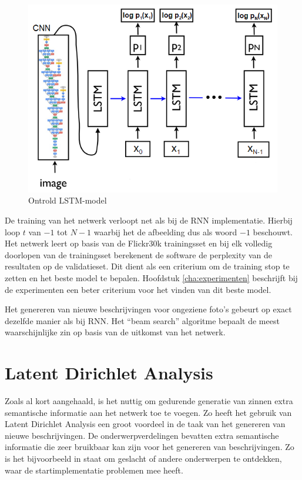 \begin{figure}[tb]
	\centering
	\includegraphics[width=1\linewidth]{Images/vinyals_karpathy.PNG}
	\caption{Ontrold LSTM-model}
	\label{fig:vinyals:karpathy}
\end{figure}

De training van het netwerk verloopt net als bij de RNN implementatie. Hierbij loop $t$ van $-1$ tot $N-1$ waarbij het de afbeelding dus als woord $-1$ beschouwt. Het netwerk leert op basis van de Flickr30k trainingsset en bij elk volledig doorlopen van de trainingsset berekenent de software de perplexity van de resultaten op de validatieset. Dit dient als een criterium om de training stop te zetten en het beste model te bepalen. Hoofdstuk \ref{cha:experimenten} beschrijft bij de experimenten een beter criterium voor het vinden van dit beste model.


Het genereren van nieuwe beschrijvingen voor ongeziene foto's gebeurt op exact dezelfde manier als bij RNN. Het ``beam search'' algoritme bepaalt de meest waarschijnlijke zin op basis van de uitkomst van het netwerk.


\section{Latent Dirichlet Analysis}
Zoals al kort aangehaald, is het nuttig om gedurende generatie van zinnen extra semantische informatie aan het netwerk toe te voegen.
Zo heeft het gebruik van Latent Dirichlet Analysis een groot voordeel in de taak van het genereren van nieuwe beschrijvingen. De onderwerpverdelingen bevatten extra semantische informatie die zeer bruikbaar kan zijn voor het genereren van beschrijvingen. Zo is het bijvoorbeeld in staat om geslacht of andere onderwerpen te ontdekken, waar de startimplementatie problemen mee heeft.

